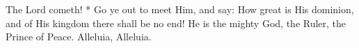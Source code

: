 The Lord cometh! * Go ye out to meet Him, and say: How great is His dominion, and of His kingdom there shall be no end! He is the mighty God, the Ruler, the Prince of Peace. Alleluia, Alleluia.